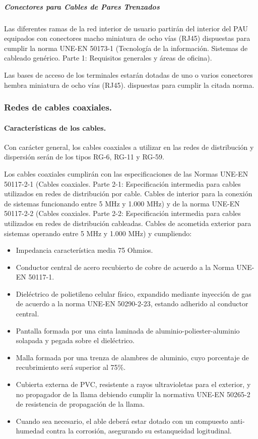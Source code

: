\subparagraph{Conectores para Cables de Pares Trenzados}
Las diferentes ramas de la red interior de usuario partirán del interior del PAU equipados con conectores macho miniatura de ocho vías (RJ45) dispuestas para cumplir la norma UNE-EN 50173-1 (Tecnología de la información. Sistemas de cableado genérico. Parte 1: Requisitos generales y áreas de oficina).

Las bases de acceso de los terminales estarán dotadas de uno o varios conectores hembra miniatura de ocho vías (RJ45). dispuestas para cumplir la citada norma.

\subsubsection{Redes de cables coaxiales.}
\paragraph{Características de los cables.}
Con carácter general, los cables coaxiales a utilizar en las redes de distribución y dispersión serán de los tipos RG-6, RG-11 y RG-59.

Los cables coaxiales cumplirán con las especificaciones de las Normas UNE-EN 50117-2-1 (Cables  coaxiales. Parte 2-1: Especificación intermedia para cables utilizados en redes de distribución por cable. Cables de interior para la conexión de sistemas funcionando entre 5 MHz y 1.000 MHz) y de la norma UNE-EN 50117-2-2 (Cables coaxiales. Parte 2-2: Especificación intermedia para cables utilizados en redes de distribución cableadas. Cables de acometida exterior para sistemas operando entre 5 MHz y 1.000 MHz) y cumpliendo:
\begin{itemize}
	\item Impedancia característica media 75 Ohmios.
	\item Conductor central de acero recubierto de cobre de acuerdo a la Norma UNE-EN 50117-1.
	\item Dieléctrico de polietileno celular físico, expandido mediante inyección de gas de acuerdo a la norma UNE-EN 50290-2-23, estando adherido al conductor central.
	\item Pantalla formada por una cinta laminada de aluminio-poliester-aluminio solapada y pegada sobre el dieléctrico.
	\item Malla formada por una trenza de alambres de aluminio, cuyo porcentaje de recubrimiento será superior al 75\%.
	\item Cubierta externa de PVC, resistente a rayos ultravioletas para el exterior, y no propagador de la llama debiendo cumplir la normativa UNE-EN 50265-2 de resistencia de propagación de la llama.
	\item Cuando sea necesario, el able deberá estar dotado con un compuesto anti-humedad contra la corrosión, asegurando su estanqueidad logitudinal.
\end{itemize}

